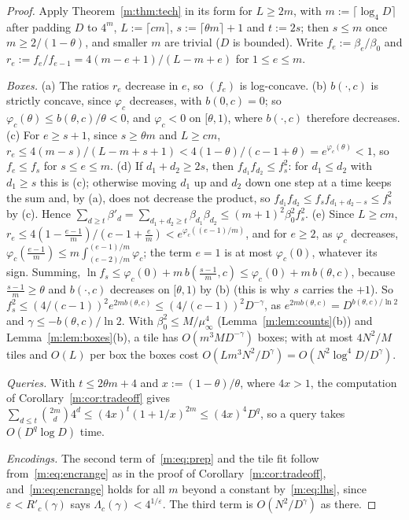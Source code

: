 \documentclass[11pt]{article}
\theoremstyle{definition}
\theoremstyle{remark}
\begin{document}
\begin{proof}
Apply Theorem~\ref{m:thm:tech} in its form for $L\ge2m$, with $m:=\lceil\log_4D\rceil$ after padding $D$ to $4^m$, $L:=\lceil cm\rceil$, $s:=\lceil\theta m\rceil+1$ and $t:=2s$; then $s\le m$ once $m\ge2/(1-\theta)$, and smaller $m$ are trivial ($D$ is bounded). Write $f_e:=\beta_e/\beta_0$ and $r_e:=f_e/f_{e-1}=4(m-e+1)/(L-m+e)$ for $1\le e\le m$.

\emph{Boxes.} (a) The ratios $r_e$ decrease in $e$, so $(f_e)$ is log-concave. (b) $b(\cdot,c)$ is strictly concave, since $\varphi_c$ decreases, with $b(0,c)=0$; so $\varphi_c(\theta)\le b(\theta,c)/\theta<0$, and $\varphi_c<0$ on $[\theta,1)$, where $b(\cdot,c)$ therefore decreases. (c) For $e\ge s+1$, since $s\ge\theta m$ and $L\ge cm$, $r_e\le4(m-s)/(L-m+s+1)<4(1-\theta)/(c-1+\theta)=e^{\varphi_c(\theta)}<1$, so $f_e\le f_s$ for $s\le e\le m$. (d) If $d_1+d_2\ge2s$, then $f_{d_1}f_{d_2}\le f_s^2$: for $d_1\le d_2$ with $d_1\ge s$ this is (c); otherwise moving $d_1$ up and $d_2$ down one step at a time keeps the sum and, by (a), does not decrease the product, so $f_{d_1}f_{d_2}\le f_sf_{d_1+d_2-s}\le f_s^2$ by (c). Hence $\sum_{d\ge t}\beta'_d=\sum_{d_1+d_2\ge t}\beta_{d_1}\beta_{d_2}\le(m+1)^2\beta_0^2f_s^2$. (e) Since $L\ge cm$, $r_e\le4(1-\frac{e-1}m)/(c-1+\frac em)<e^{\varphi_c((e-1)/m)}$, and for $e\ge2$, as $\varphi_c$ decreases, $\varphi_c(\frac{e-1}m)\le m\int_{(e-2)/m}^{(e-1)/m}\varphi_c$; the term $e=1$ is at most $\varphi_c(0)$, whatever its sign. Summing, $\ln f_s\le\varphi_c(0)+m\,b(\frac{s-1}m,c)\le\varphi_c(0)+m\,b(\theta,c)$, because $\frac{s-1}m\ge\theta$ and $b(\cdot,c)$ decreases on $[\theta,1)$ by (b) (this is why $s$ carries the $+1$).
So $f_s^2\le(4/(c-1))^2e^{2mb(\theta,c)}\le(4/(c-1))^2D^{-\gamma}$, as $e^{2mb(\theta,c)}=D^{b(\theta,c)/\ln2}$ and $\gamma\le-b(\theta,c)/\ln2$. With $\beta_0^2\le M/\mu_\infty^4$ (Lemma~\ref{m:lem:counts}(b)) and Lemma~\ref{m:lem:boxes}(b), a tile has $O(m^3MD^{-\gamma})$ boxes; with at most $4N^2/M$ tiles and $O(L)$ per box the boxes cost $O(Lm^3N^2/D^\gamma)=O(N^2\log^4\!D/D^\gamma)$.

\emph{Queries.} With $t\le2\theta m+4$ and $x:=(1-\theta)/\theta$, where $4x>1$, the computation of Corollary~\ref{m:cor:tradeoff} gives $\sum_{d\le t}\binom{2m}d4^d\le(4x)^t(1+1/x)^{2m}\le(4x)^4D^q$, so a query takes $O(D^q\log D)$ time.

\emph{Encodings.} The second term of~\eqref{m:eq:prep} and the tile fit follow from~\eqref{m:eq:encrange} as in the proof of Corollary~\ref{m:cor:tradeoff}, and~\eqref{m:eq:encrange} holds for all $m$ beyond a constant by~\eqref{m:eq:lhs}, since $\varepsilon<R'_c(\gamma)$ says $\Lambda_c(\gamma)<4^{1/\varepsilon}$. The third term is $O(N^2/D^\gamma)$ as there.
\end{proof}
\end{document}
